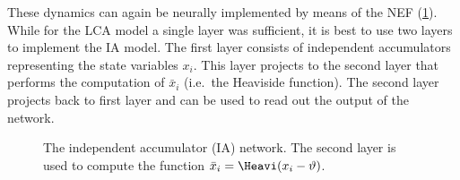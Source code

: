These dynamics can again be neurally implemented by means of the NEF (\cref{fig:ia}).
While for the LCA model a single layer was sufficient, it is best to use two layers to implement the IA model.
The first layer consists of independent accumulators representing the state variables $x_i$.
This layer projects to the second layer that performs the computation of $\bar{x}_i$ (i.e.\ the Heaviside function).
The second layer projects back to first layer and can be used to read out the output of the network.
\begin{figure}
    \begin{captionbeside}{The independent accumulator (IA) network. The second layer is used to compute the function $\bar{x}_i = \Heavi(x_i - \vartheta)$.\label{fig:ia}}
    \end{captionbeside}
\end{figure}

